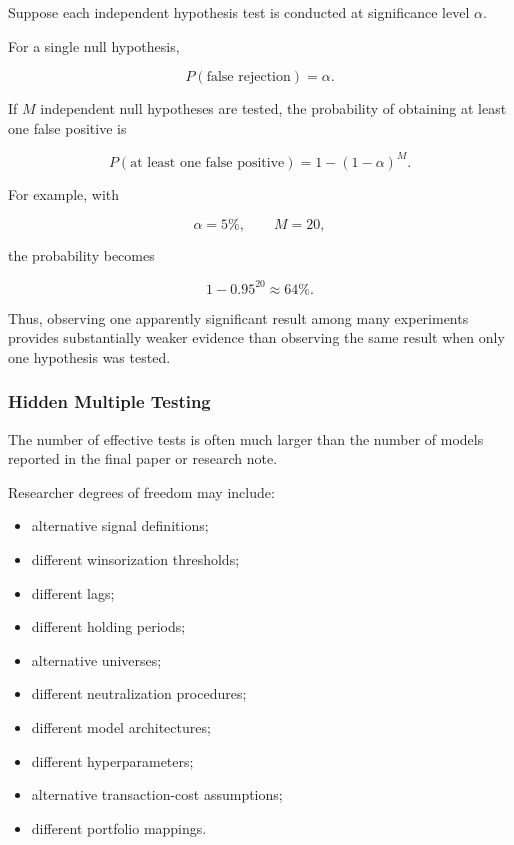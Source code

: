 \documentclass[11pt,a4paper]{article}
\begin{document}
Suppose each independent hypothesis test is conducted at significance level
$\alpha$.

For a single null hypothesis,

\begin{equation}
P(\text{false rejection})=\alpha.
\end{equation}

If $M$ independent null hypotheses are tested, the probability of obtaining at
least one false positive is

\begin{equation}
\boxed{
P(\text{at least one false positive})
=
1-(1-\alpha)^M.
}
\end{equation}

For example, with

\begin{equation}
\alpha=5\%,
\qquad
M=20,
\end{equation}

the probability becomes

\begin{equation}
1-0.95^{20}
\approx
64\%.
\end{equation}

Thus, observing one apparently significant result among many experiments
provides substantially weaker evidence than observing the same result when only
one hypothesis was tested.


\subsubsection{Hidden Multiple Testing}

The number of effective tests is often much larger than the number of models
reported in the final paper or research note.

Researcher degrees of freedom may include:

\begin{itemize}
    \item alternative signal definitions;
    \item different winsorization thresholds;
    \item different lags;
    \item different holding periods;
    \item alternative universes;
    \item different neutralization procedures;
    \item different model architectures;
    \item different hyperparameters;
    \item alternative transaction-cost assumptions;
    \item different portfolio mappings.
\end{itemize}
\end{document}
